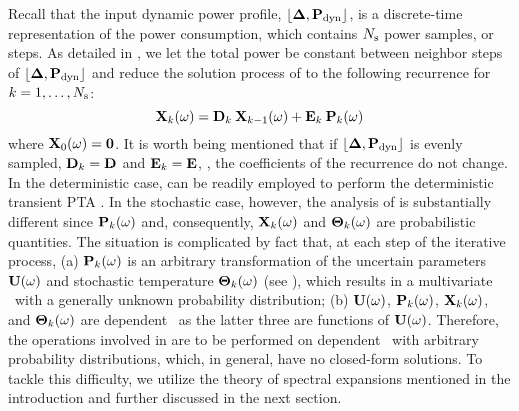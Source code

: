 Recall that the input dynamic power profile, $\profPdyn$, is a discrete-time representation of the power consumption, which contains $N_\text{s}$ power samples, or steps. As detailed in , we let the total power be constant between neighbor steps of $\profPdyn$ and reduce the solution process of  to the following recurrence for $k = 1, \dotsc, N_\text{s}$:
\begin{equation} \elabel{recurrence}
  \vX_k(\o) = \mCF_k \: \vX_{k - 1}(\o) + \mCS_k \: \vP_k(\o)
\end{equation}
where $\mathbf{X}_0(\omega) = \mathbf{0}$. It is worth being mentioned that if $\profPdyn$ is evenly sampled, $\mCF_k = \mCF$ and $\mCS_k = \mCS$, \ie, the coefficients of the recurrence do not change. In the deterministic case,  can be readily employed to perform the deterministic transient PTA \cite{thiele2011, ukhov2012}. In the stochastic case, however, the analysis of  is substantially different since $\mathbf{P}_k(\omega)$ and, consequently, $\mathbf{X}_k(\omega)$ and ${\boldsymbol\Theta}_k(\omega)$ are probabilistic quantities. The situation is complicated by fact that, at each step of the iterative process, (a) $\mathbf{P}_k(\omega)$ is an arbitrary transformation of the uncertain parameters $\mathbf{U}(\omega)$ and stochastic temperature ${\boldsymbol\Theta}_k(\omega)$ (see ), which results in a multivariate \rv\ with a generally unknown probability distribution; (b) $\mathbf{U}(\omega)$, $\mathbf{P}_k(\omega)$, $\mathbf{X}_k(\omega)$, and ${\boldsymbol\Theta}_k(\omega)$ are dependent \rvs\ as the latter three are functions of $\mathbf{U}(\omega)$. Therefore, the operations involved in  are to be performed on dependent \rvs\ with arbitrary probability distributions, which, in general, have no closed-form solutions. To tackle this difficulty, we utilize the theory of spectral expansions mentioned in the introduction and further discussed in the next section.
